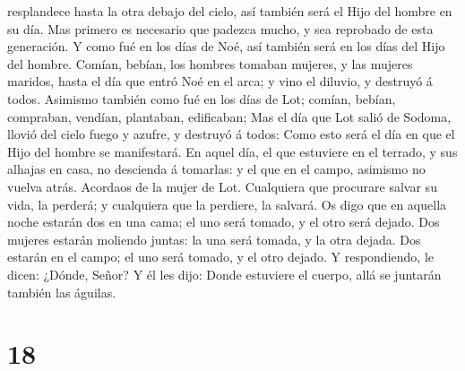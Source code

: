 resplandece hasta la otra debajo del cielo, así también será el Hijo del
hombre en su día.  Mas primero es necesario que padezca
mucho, y sea reprobado de esta generación.  Y como fué en
los días de Noé, así también será en los días del Hijo del hombre.
 Comían, bebían, los hombres tomaban mujeres, y las mujeres
maridos, hasta el día que entró Noé en el arca; y vino el diluvio, y
destruyó á todos.  Asimismo también como fué en los días de
Lot; comían, bebían, compraban, vendían, plantaban, edificaban;
 Mas el día que Lot salió de Sodoma, llovió del cielo fuego
y azufre, y destruyó á todos:  Como esto será el día en que
el Hijo del hombre se manifestará.  En aquel día, el que
estuviere en el terrado, y sus alhajas en casa, no descienda á tomarlas:
y el que en el campo, asimismo no vuelva atrás.  Acordaos
de la mujer de Lot.  Cualquiera que procurare salvar su
vida, la perderá; y cualquiera que la perdiere, la salvará.
 Os digo que en aquella noche estarán dos en una cama; el
uno será tomado, y el otro será dejado.  Dos mujeres
estarán moliendo juntas: la una será tomada, y la otra dejada.
 Dos estarán en el campo; el uno será tomado, y el otro
dejado.  Y respondiendo, le dicen: ¿Dónde, Señor? Y él les
dijo: Donde estuviere el cuerpo, allá se juntarán también las águilas.

\hypertarget{section-17}{%
\section{18}\label{section-17}}

